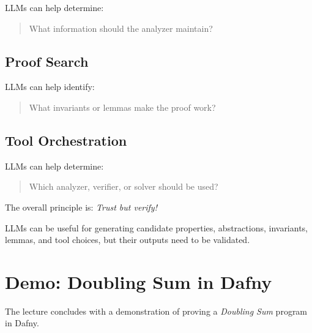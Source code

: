 LLMs can help determine:

\begin{quote}
What information should the analyzer maintain?
\end{quote}

\subsection{Proof Search}

LLMs can help identify:

\begin{quote}
What invariants or lemmas make the proof work?
\end{quote}

\subsection{Tool Orchestration}

LLMs can help determine:

\begin{quote}
Which analyzer, verifier, or solver should be used?
\end{quote}

\begin{ppnote}
The overall principle is: \emph{Trust but verify!}

LLMs can be useful for generating candidate properties, abstractions,
invariants, lemmas, and tool choices, but their outputs need to be
validated.
\end{ppnote}


\section{Demo: Doubling Sum in Dafny}

The lecture concludes with a demonstration of proving a
\emph{Doubling Sum} program in Dafny.
